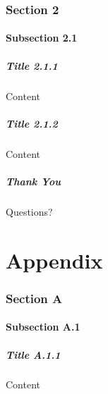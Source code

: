 \documentclass[compress,12pt]{beamer}%
\begin{document}
\section{Section 2}
\subsection{Subsection 2.1}
\begin{frame}
\frametitle{Title 2.1.1}
Content
\end{frame}

\begin{frame}
\frametitle{Title 2.1.2}
Content
\end{frame}

\appendix

\begin{frame}[plain,c]
\frametitle{Thank You}
\begin{center}
\Huge Questions?
\end{center}
\end{frame}

\part{Appendix}
\frame{\partpage}

\section{Section A}
\subsection{Subsection A.1}
\begin{frame}
\frametitle{Title A.1.1}
Content
\end{frame}
\end{document}
